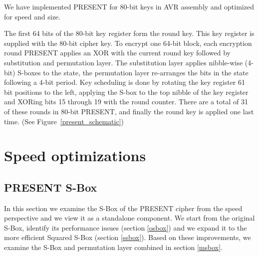\documentclass{llncs}
\begin{document}
We have implemented PRESENT for 80-bit keys in AVR assembly and optimized for speed and size.



The first 64 bits of the 80-bit key register form the round key.
This key register is supplied with the 80-bit cipher key.
To encrypt one 64-bit block, each encryption round PRESENT applies an XOR with the current round key followed by substitution and permutation layer.
The substitution layer applies nibble-wise (4-bit) S-boxes to the state, the permutation layer re-arranges the bits in the state following a 4-bit period.
Key scheduling is done by rotating the key register 61 bit positions to the left, applying the S-box to the top nibble of the key register and XORing bits 15 through 19 with the round counter.
There are a total of 31 of these rounds in 80-bit PRESENT, and finally the round key is applied one last time.
(See Figure~\ref{present_schematic})


\section{Speed optimizations}
\subsection{PRESENT S-Box}\label{sbox}
In this section we examine the S-Box of the PRESENT cipher from the speed perspective and we view it as a standalone component. We start from the original S-Box, identify its performance issues (section \ref{osbox}) and we expand it to the more efficient Squared S-Box (section \ref{ssbox}). Based on these improvements, we examine the S-Box and permutation layer combined  in section \ref{msbox}.
\end{document}
